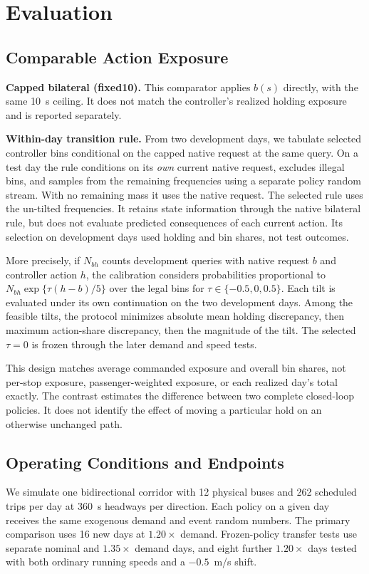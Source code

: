 \documentclass[journal]{IEEEtran}
\begin{document}
\section{Evaluation}
\subsection{Comparable Action Exposure}
\textbf{Capped bilateral (fixed10).} This comparator applies $b(s)$ directly, with the same 10~s ceiling. It does not match the controller's realized holding exposure and is reported separately.

\textbf{Within-day transition rule.} From two development days, we tabulate selected controller bins conditional on the capped native request at the same query. On a test day the rule conditions on its \emph{own} current native request, excludes illegal bins, and samples from the remaining frequencies using a separate policy random stream. With no remaining mass it uses the native request. The selected rule uses the un-tilted frequencies. It retains state information through the native bilateral rule, but does not evaluate predicted consequences of each current action. Its selection on development days used holding and bin shares, not test outcomes.

More precisely, if $N_{bh}$ counts development queries with native request $b$ and controller action $h$, the calibration considers probabilities proportional to $N_{bh}\exp\{\tau(h-b)/5\}$ over the legal bins for $\tau\in\{-0.5,0,0.5\}$. Each tilt is evaluated under its own continuation on the two development days. Among the feasible tilts, the protocol minimizes absolute mean holding discrepancy, then maximum action-share discrepancy, then the magnitude of the tilt. The selected $\tau=0$ is frozen through the later demand and speed tests.

This design matches average commanded exposure and overall bin shares, not per-stop exposure, passenger-weighted exposure, or each realized day's total exactly. The contrast estimates the difference between two complete closed-loop policies. It does not identify the effect of moving a particular hold on an otherwise unchanged path.

\subsection{Operating Conditions and Endpoints}
We simulate one bidirectional corridor with 12 physical buses and 262 scheduled trips per day at 360~s headways per direction. Each policy on a given day receives the same exogenous demand and event random numbers. The primary comparison uses 16 new days at $1.20\times$ demand. Frozen-policy transfer tests use separate nominal and $1.35\times$ demand days, and eight further $1.20\times$ days tested with both ordinary running speeds and a $-0.5$~m/s shift.
\end{document}
